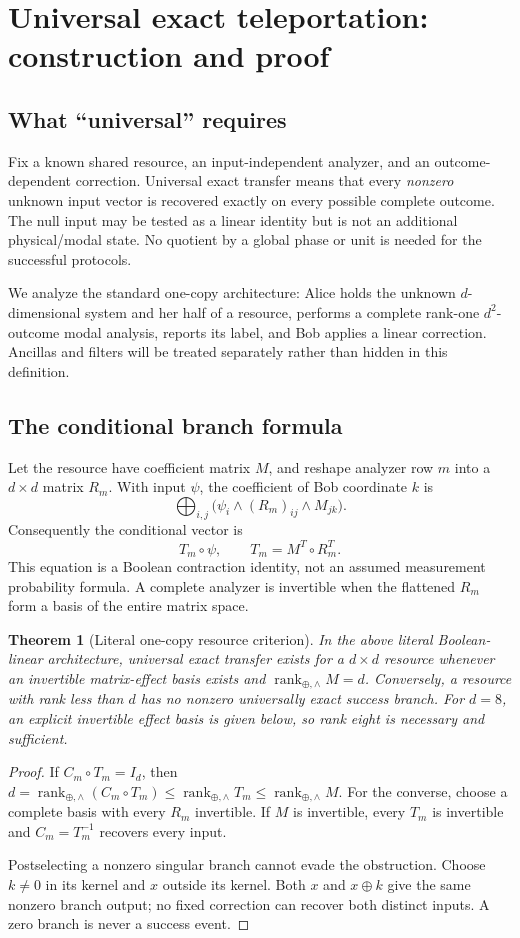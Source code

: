\documentclass[11pt,a4paper]{article}
\newtheorem{theorem}{Theorem}[section]
\theoremstyle{definition}\newtheorem{definition}[theorem]{Definition}
\newcommand{\rk}{\operatorname{rank}_{\oplus,\wedge}}
\begin{document}
\section{Universal exact teleportation: construction and proof}
\subsection{What ``universal'' requires}
Fix a known shared resource, an input-independent analyzer, and an outcome-dependent correction. Universal exact transfer means that every \emph{nonzero} unknown input vector is recovered exactly on every possible complete outcome. The null input may be tested as a linear identity but is not an additional physical/modal state. No quotient by a global phase or unit is needed for the successful protocols.

We analyze the standard one-copy architecture: Alice holds the unknown $d$-dimensional system and her half of a resource, performs a complete rank-one $d^2$-outcome modal analysis, reports its label, and Bob applies a linear correction. Ancillas and filters will be treated separately rather than hidden in this definition.

\subsection{The conditional branch formula}
Let the resource have coefficient matrix $M$, and reshape analyzer row $m$ into a $d\times d$ matrix $R_m$. With input $\psi$, the coefficient of Bob coordinate $k$ is
\[
 \bigoplus_{i,j}\bigl(\psi_i\wedge (R_m)_{ij}\wedge M_{jk}\bigr).
\]
Consequently the conditional vector is
\begin{equation}
 T_m\circ\psi,\qquad T_m=M^T\circ R_m^T.
 \label{eq:branch}
\end{equation}
This equation is a Boolean contraction identity, not an assumed measurement probability formula. A complete analyzer is invertible when the flattened $R_m$ form a basis of the entire matrix space.

\begin{theorem}[Literal one-copy resource criterion]\label{thm:tele}
In the above literal Boolean-linear architecture, universal exact transfer exists for a $d\times d$ resource whenever an invertible matrix-effect basis exists and $\rk M=d$. Conversely, a resource with rank less than $d$ has no nonzero universally exact success branch. For $d=8$, an explicit invertible effect basis is given below, so rank eight is necessary and sufficient.
\end{theorem}
\begin{proof}
If $C_m\circ T_m=I_d$, then $d=\rk(C_m\circ T_m)\le\rk T_m\le\rk M$. For the converse, choose a complete basis with every $R_m$ invertible. If $M$ is invertible, every $T_m$ is invertible and $C_m=T_m^{-1}$ recovers every input.

Postselecting a nonzero singular branch cannot evade the obstruction. Choose $k\ne0$ in its kernel and $x$ outside its kernel. Both $x$ and $x\oplus k$ give the same nonzero branch output; no fixed correction can recover both distinct inputs. A zero branch is never a success event.
\end{proof}
\end{document}
